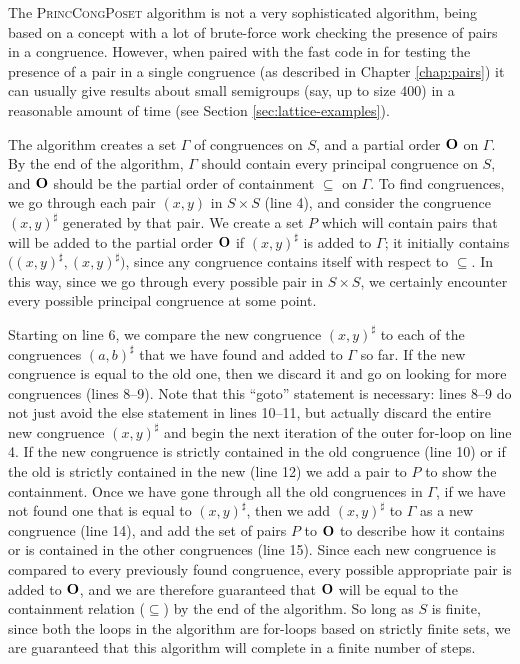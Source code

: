 The \textsc{PrincCongPoset} algorithm is not a very sophisticated algorithm,
being based on a concept with a lot of brute-force work checking the presence of
pairs in a congruence.  However, when paired with the fast code in
\libsemigroups{} \cite{libsemigroups} for testing the presence of a pair
in a single congruence (as described in Chapter \ref{chap:pairs}) it can usually
give results about small semigroups (say, up to size $400$) in a reasonable
amount of time (see Section \ref{sec:lattice-examples}).

The algorithm creates a set $\Gamma$ of congruences on $S$, and a partial order
$\mathbf{O}$ on $\Gamma$.  By the end of the algorithm, $\Gamma$ should contain every
principal congruence on $S$, and $\mathbf{O}$ should be the partial order of
containment $\subseteq$ on $\Gamma$.  To find congruences, we go through each
pair $(x,y)$ in $S \times S$ (line 4), and consider the congruence
$(x,y)^\sharp$ generated by that pair.  We create a set $P$ which will contain
pairs that will be added to the partial order $\mathbf{O}$ if $(x,y)^\sharp$ is added
to $\Gamma$; it initially contains $\big((x,y)^\sharp,(x,y)^\sharp\big)$, since
any congruence contains itself with respect to $\subseteq$.  In this way, since
we go through every possible pair in $S \times S$, we certainly encounter every
possible principal congruence at some point.

Starting on line 6, we compare the new congruence $(x,y)^\sharp$ to each of the
congruences $(a,b)^\sharp$ that we have found and added to $\Gamma$ so far.  If
the new congruence is equal to the old one, then we discard it and go on looking
for more congruences (lines 8--9).  Note that this ``goto'' statement is
necessary: lines 8--9 do not just avoid the else statement in lines 10--11, but
actually discard the entire new congruence $(x,y)^\sharp$ and begin the next
iteration of the outer for-loop on line 4.
If the new congruence is strictly contained
in the old congruence (line 10) or if the old is strictly contained in the new
(line 12) we add a pair to $P$ to show the containment.  Once we have gone
through all the old congruences in $\Gamma$, if we have not found one that is
equal to $(x,y)^\sharp$, then we add $(x,y)^\sharp$ to $\Gamma$ as a new
congruence (line 14), and add the set of pairs $P$ to $\mathbf{O}$ to describe how it
contains or is contained in the other congruences (line 15).  Since each new
congruence is compared to every previously found congruence, every possible
appropriate pair is added to $\mathbf{O}$, and we are therefore guaranteed that $\mathbf{O}$
will be equal to the containment relation ($\subseteq$) by the end of the
algorithm.  So long as $S$ is finite, since both the loops in the algorithm are
for-loops based on strictly finite sets, we are guaranteed that this algorithm
will complete in a finite number of steps.

